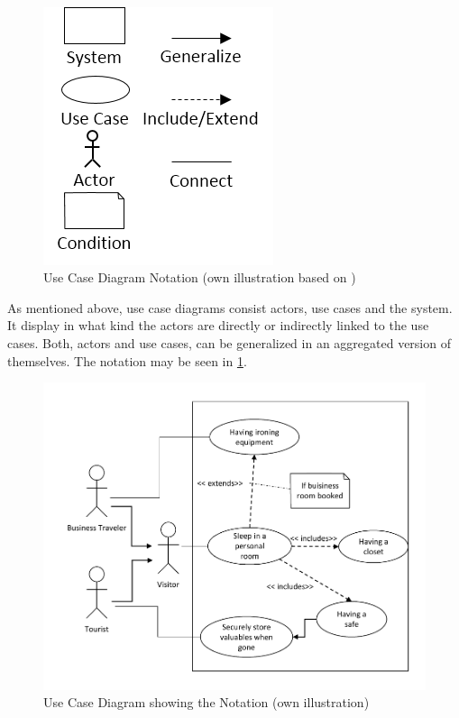 \paragraph{} 
\begin{figure}[H]
    \centering
    \includegraphics[scale=0.9]{img/ucSymb.png}
    \caption[Use Case Diagram Notation]{Use Case Diagram Notation (own illustration based on \cite[163]{Pohl.2007})}
    \label{fig:ucSymb}
\end{figure}
As mentioned above, use case diagrams consist actors, use cases and the system. It display in what kind the actors are directly or indirectly linked to the use cases. Both, actors and use cases, can be generalized in an aggregated version of themselves. The notation may be seen in \cref{fig:ucSymb}.

\begin{figure}[H]
    \centering
    \includegraphics[scale=0.9]{img/ucEx.pdf}
    \caption[Example Use Case Diagram]{Use Case Diagram showing the Notation (own illustration)}
    \label{fig:ucEx}
\end{figure}

